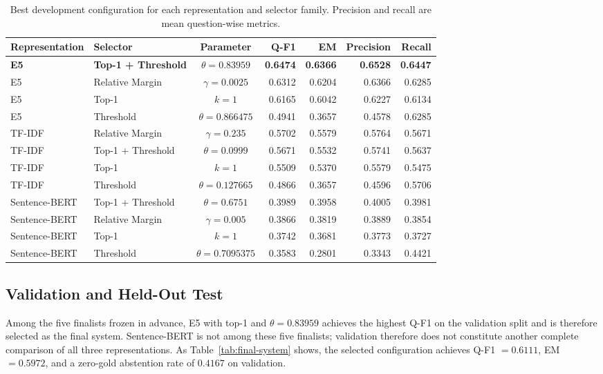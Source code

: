 \documentclass[11pt]{article}
\begin{document}
\begin{table}[t]
\centering
\small
\begin{tabular}{llcrrrr}
\toprule
\textbf{Representation} & \textbf{Selector} & \textbf{Parameter} & \textbf{Q-F1} & \textbf{EM} & \textbf{Precision} & \textbf{Recall} \\
\midrule
\textbf{E5} & \textbf{Top-1 + Threshold} & $\theta=0.83959$ & \textbf{0.6474} & \textbf{0.6366} & \textbf{0.6528} & \textbf{0.6447} \\
E5 & Relative Margin & $\gamma=0.0025$ & 0.6312 & 0.6204 & 0.6366 & 0.6285 \\
E5 & Top-1 & $k=1$ & 0.6165 & 0.6042 & 0.6227 & 0.6134 \\
E5 & Threshold & $\theta=0.866475$ & 0.4941 & 0.3657 & 0.4578 & 0.6285 \\
\midrule
TF-IDF & Relative Margin & $\gamma=0.235$ & 0.5702 & 0.5579 & 0.5764 & 0.5671 \\
TF-IDF & Top-1 + Threshold & $\theta=0.0999$ & 0.5671 & 0.5532 & 0.5741 & 0.5637 \\
TF-IDF & Top-1 & $k=1$ & 0.5509 & 0.5370 & 0.5579 & 0.5475 \\
TF-IDF & Threshold & $\theta=0.127665$ & 0.4866 & 0.3657 & 0.4596 & 0.5706 \\
\midrule
Sentence-BERT & Top-1 + Threshold & $\theta=0.6751$ & 0.3989 & 0.3958 & 0.4005 & 0.3981 \\
Sentence-BERT & Relative Margin & $\gamma=0.005$ & 0.3866 & 0.3819 & 0.3889 & 0.3854 \\
Sentence-BERT & Top-1 & $k=1$ & 0.3742 & 0.3681 & 0.3773 & 0.3727 \\
Sentence-BERT & Threshold & $\theta=0.7095375$ & 0.3583 & 0.2801 & 0.3343 & 0.4421 \\
\bottomrule
\end{tabular}
\caption{Best development configuration for each representation and selector family. Precision and recall are mean question-wise metrics.}
\label{tab:development-results}
\end{table}

\subsection{Validation and Held-Out Test}

Among the five finalists frozen in advance, E5 with top-1 and $\theta=0.83959$ achieves the highest Q-F1 on the validation split and is therefore selected as the final system. Sentence-BERT is not among these five finalists; validation therefore does not constitute another complete comparison of all three representations. As Table~\ref{tab:final-system} shows, the selected configuration achieves Q-F1 $=0.6111$, EM $=0.5972$, and a zero-gold abstention rate of $0.4167$ on validation.
\end{document}
